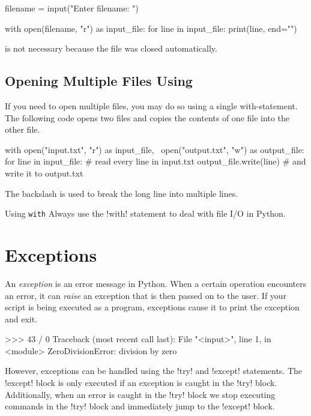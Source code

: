 \documentclass[11pt]{cselabheader}
\begin{document}
\begin{python3code}
filename = input("Enter filename: ")

with open(filename, "r") as input_file:
    for line in input_file:
        print(line, end="")
\end{python3code}

 is not necessary because the file was closed
automatically.

\subsection{Opening Multiple Files Using }

If you need to open multiple files, you may do so using a single with-statement.
The following code opens two files and copies the contents of one file into
the other file.

\begin{python3code}
with open("input.txt", "r") as input_file, \
     open("output.txt", "w") as output_file:
    for line in input_file:  # read every line in input.txt
        output_file.write(line)  # and write it to output.txt
\end{python3code}

The backslash is used to break the long line into multiple lines.

\begin{warningbox}{Using \texttt{with}}
  Always use the \pythoninline!with! statement to deal with file I/O in Python.
\end{warningbox}

\section{Exceptions}

An \emph{exception} is an error message in Python. When a certain operation
encounters an error, it can \emph{raise} an exception that is then passed on to
the user. If your script is being executed as a program, exceptions cause it to
print the exception and exit.

\begin{pyconcode}
>>> 43 / 0
Traceback (most recent call last):
  File "<input>", line 1, in <module>
ZeroDivisionError: division by zero
\end{pyconcode}

However, exceptions can be handled using the \pythoninline!try!
and \pythoninline!except! statements.
The \pythoninline!except! block is only executed if an exception is caught in
the \pythoninline!try! block. Additionally, when an error is caught in the
\pythoninline!try! block we stop executing commands in the \pythoninline!try!
block and immediately jump to the \pythoninline!except! block.
\end{document}
